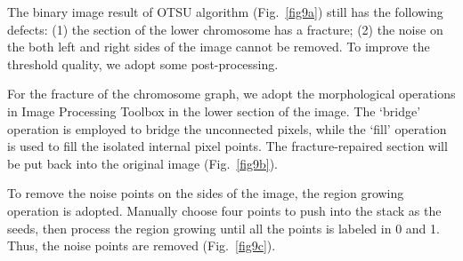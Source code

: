 \documentclass[hyperref]{article}
\theoremstyle{nonumberplain}
\begin{document}
	
	The binary image result of OTSU algorithm (Fig.~\ref{fig9a}) still has the following defects: (1) the section of the lower chromosome has a fracture; (2) the noise on the both left and right sides of the image cannot be removed. To improve the threshold quality, we adopt some post-processing.
	
	For the fracture of the chromosome graph, we adopt the morphological operations in Image Processing Toolbox in the lower section of the image. The ‘bridge’ operation is employed to bridge the unconnected pixels, while the ‘fill’ operation is used to fill the isolated internal pixel points. The fracture-repaired section will be put back into the original image (Fig.~\ref{fig9b}).
	
	To remove the noise points on the sides of the image, the region growing operation is adopted. Manually choose four points to push into the stack as the seeds, then process the region growing until all the points is labeled in 0 and 1. Thus, the noise points are removed (Fig.~\ref{fig9c}).
	
\end{document}
